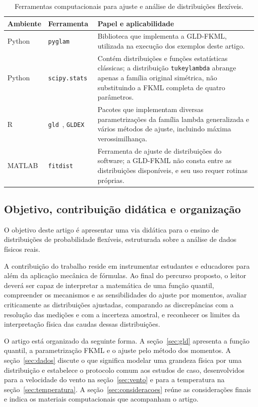 \begin{table}[htbp]
\centering
\caption{Ferramentas computacionais para ajuste e análise de distribuições flexíveis.}
\label{tab:ferramentas}
\small
\begin{tabular}{p{1.8cm} p{2.6cm} p{9.6cm}}
\toprule
\textbf{Ambiente} & \textbf{Ferramenta} & \textbf{Papel e aplicabilidade} \\
\midrule
Python & \texttt{pyglam}~\cite{pyglam} & Biblioteca que implementa a GLD-FKML, utilizada na execução dos exemplos deste artigo. \\
Python & \texttt{scipy.stats}~\cite{scipy2020} & Contém distribuições e funções estatísticas clássicas; a distribuição \texttt{tukeylambda} abrange apenas a família original simétrica, não substituindo a FKML completa de quatro parâmetros. \\
R & \texttt{gld}~\cite{KingGld}, \texttt{GLDEX}~\cite{su2007} & Pacotes que implementam diversas parametrizações da família lambda generalizada e vários métodos de ajuste, incluindo máxima verossimilhança. \\
MATLAB & \texttt{fitdist}~\cite{matlabfitdist} & Ferramenta de ajuste de distribuições do software; a GLD-FKML não consta entre as distribuições disponíveis, e seu uso requer rotinas próprias. \\
\bottomrule
\end{tabular}
\end{table}

\subsection{Objetivo, contribuição didática e organização}

O objetivo deste artigo é apresentar uma via didática para o ensino de distribuições de probabilidade flexíveis, estruturada sobre a análise de dados físicos reais.

A contribuição do trabalho reside em instrumentar estudantes e educadores para além da aplicação mecânica de fórmulas. Ao final do percurso proposto, o leitor deverá ser capaz de interpretar a matemática de uma função quantil, compreender os mecanismos e as sensibilidades do ajuste por momentos, avaliar criticamente as distribuições ajustadas, comparando as discrepâncias com a resolução das medições e com a incerteza amostral, e reconhecer os limites da interpretação física das caudas dessas distribuições.

O artigo está organizado da seguinte forma. A seção~\ref{sec:gld} apresenta a função quantil, a parametrização FKML e o ajuste pelo método dos momentos. A seção~\ref{sec:dados} discute o que significa modelar uma grandeza física por uma distribuição e estabelece o protocolo comum aos estudos de caso, desenvolvidos para a velocidade do vento na seção~\ref{sec:vento} e para a temperatura na seção~\ref{sec:temperatura}. A seção~\ref{sec:consideracoes} reúne as considerações finais e indica os materiais computacionais que acompanham o artigo.
